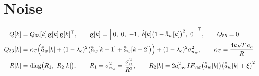 \documentclass[11pt,a4paper,fontset=none]{ctexart}
\newcommand{\ba}{\bar{a}}
\newcommand{\ah}{\hat{\ba}_w}
\newcommand{\bh}{\hat{b}}
\begin{document}
\section{Noise}

\begin{align*}
Q[k]    &= Q_{33}[k]\,\mathbf{g}[k]\,\mathbf{g}[k]^{\top}, \qquad
\mathbf{g}[k] = \Bigl[\,0,\ 0,\ -1,\ \bh[k]\bigl(1-\ah[k]\bigr)^{2},\ 0\,\Bigr]^{\top}, \qquad Q_{55} = 0 \\
Q_{33}[k] &= \kappa_T\Bigl(\ah[k] + (1-\lambda_c)^{2}\bigl(\ah[k-1] + \ah[k-2]\bigr)\Bigr) + (1-\lambda_c)^{2}\sigma^{2}_{n_w},
\qquad \kappa_T = \frac{4k_BT\,a_o}{R} \\
R[k]    &= \mathrm{diag}\bigl(R_1,\ R_2[k]\bigr), \qquad R_1 = \sigma^{2}_{n_w} = \frac{\sigma^{2}_{n}}{R^{2}}, \qquad
R_2[k] = 2a_{\mathrm{cov}}^{2}\,IF_{\mathrm{var}}\bigl(\ah[k]\bigr)\bigl(\ah[k] + \xi\bigr)^{2}
\end{align*}
\end{document}
